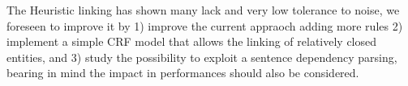 \documentclass{article}
\begin{document}
The Heuristic linking has shown many lack and very low tolerance to noise, we foreseen to improve it by 1) improve the current appraoch adding more rules 2)  implement a simple CRF model that allows the linking of relatively closed entities, and 3) study the possibility to exploit a sentence dependency parsing, bearing in mind the impact in performances should also be considered.


\listoffigures



\end{document}
